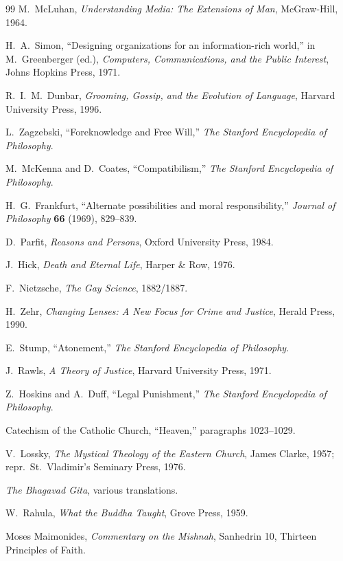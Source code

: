 \documentclass[11pt]{article}
\theoremstyle{remark}
\theoremstyle{plain}
\begin{document}
\begin{thebibliography}{99}
M.\ McLuhan,
\emph{Understanding Media: The Extensions of Man},
McGraw-Hill, 1964.

H.\ A.\ Simon,
``Designing organizations for an information-rich world,''
in M.\ Greenberger (ed.),
\emph{Computers, Communications, and the Public Interest},
Johns Hopkins Press, 1971.

R.\ I.\ M.\ Dunbar,
\emph{Grooming, Gossip, and the Evolution of Language},
Harvard University Press, 1996.

L.\ Zagzebski,
``Foreknowledge and Free Will,''
\emph{The Stanford Encyclopedia of Philosophy}.

M.\ McKenna and D.\ Coates,
``Compatibilism,''
\emph{The Stanford Encyclopedia of Philosophy}.

H.\ G.\ Frankfurt,
``Alternate possibilities and moral responsibility,''
\emph{Journal of Philosophy} \textbf{66} (1969), 829--839.

D.\ Parfit,
\emph{Reasons and Persons},
Oxford University Press, 1984.

J.\ Hick,
\emph{Death and Eternal Life},
Harper \& Row, 1976.

F.\ Nietzsche,
\emph{The Gay Science},
1882/1887.

H.\ Zehr,
\emph{Changing Lenses: A New Focus for Crime and Justice},
Herald Press, 1990.

E.\ Stump,
``Atonement,''
\emph{The Stanford Encyclopedia of Philosophy}.

J.\ Rawls,
\emph{A Theory of Justice},
Harvard University Press, 1971.

Z.\ Hoskins and A.\ Duff,
``Legal Punishment,''
\emph{The Stanford Encyclopedia of Philosophy}.

Catechism of the Catholic Church,
``Heaven,'' paragraphs 1023--1029.

V.\ Lossky,
\emph{The Mystical Theology of the Eastern Church},
James Clarke, 1957; repr.\ St.\ Vladimir's Seminary Press, 1976.

\emph{The Bhagavad Gita},
various translations.

W.\ Rahula,
\emph{What the Buddha Taught},
Grove Press, 1959.

Moses Maimonides,
\emph{Commentary on the Mishnah}, Sanhedrin 10, Thirteen Principles of Faith.


\end{thebibliography}
\end{document}
